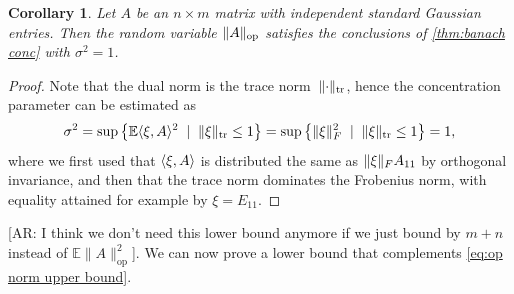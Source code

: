 \documentclass[aos]{imsart}
\newtheorem{corollary}[theorem]{Corollary}
\theoremstyle{definition}
\numberwithin{equation}{section}
\DeclareMathOperator{\op}{op}
\DeclarePairedDelimiter{\norm}{\lVert}{\rVert}
\newcommand{\E}{\mathbb{E}}
\newcommand{\AR}[1]{{\color{orange}[AR: #1]}}
\newcommand{\MW}[1]{{\color{red}[MW: #1]}}
\newcommand{\AR}[1]{{}}
\newcommand{\MW}[1]{{}}
\begin{document}
\begin{appendix}
\begin{corollary}\label{lem:opNormSubG}
Let $A$ be an $n \times m$ matrix with independent standard Gaussian entries. Then the random variable $\norm{A}_{\op}$ satisfies the conclusions of \cref{thm:banach conc} with $\sigma^{2} = 1$. 
\end{corollary}
\begin{proof}
Note that the dual norm is the trace norm~$\norm{\cdot}_{\operatorname{tr}}$, hence the concentration parameter can be estimated as
\begin{align*}
  \sigma^2
= \sup \left\{ \E \langle \xi, A \rangle^2 \;\mid\; \norm{\xi}_{\operatorname{tr}} \leq 1 \right\}
= \sup \left\{ \norm\xi_F^2 \;\mid\; \norm{\xi}_{\operatorname{tr}} \leq 1 \right\}
= 1,
\end{align*}
where we first used that $\braket{\xi,A}$ is distributed the same as $\norm\xi_F A_{11}$ by orthogonal invariance, and then that the trace norm dominates the Frobenius norm, with equality attained for example by $\xi = E_{11}$.
\end{proof}

\AR{I think we don't need this lower bound anymore if we just bound by $m+n$ instead of $\E\|A\|_{\op}^{2}$}. 
We can now prove a lower bound that complements \cref{eq:op norm upper bound}.


\end{appendix}
\end{document}
